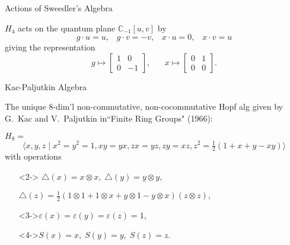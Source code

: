\documentclass{beamer}
\begin{document}
\begin{frame}{Actions of Sweedler's Algebra}

$H_4$ acts on the quantum plane $\mathbb{C}_{-1}[u,v]$ by 
\[
g\cdot u=u, \;\;\; g\cdot v=-v,\;\;\; x\cdot u=0,\;\;\;x\cdot v=u
\]
giving the representation 
\[
g\mapsto \begin{bmatrix} 1 & 0\\ 0&-1\end{bmatrix}, \;\;\;\;\;\; x\mapsto \begin{bmatrix} 0&1\\0&0\end{bmatrix}.
\]

\end{frame}

\begin{frame}{Kac-Paljutkin Algebra}

 The unique $8$-dim'l non-commutative, non-cocommutative Hopf alg given by G.\ Kac and V.\ Paljutkin in``Finite Ring Groups" (1966):\newline

    $H_8=$
    \[\Big\langle x,y,z\;\vert\; x^2=y^2=1,xy=yx,zx=yz,zy=xz,z^2=\tfrac{1}{2}(1+x+y-xy)\Big\rangle\]
    with operations
    \vspace{2ex}
    \begin{itemize}
    \setlength{\itemsep}{2ex}
    \item[]<2->
    $\triangle(x)=x\otimes x,\; \triangle(y)=y\otimes y,\;$ 
    
    \vspace{2ex}
    
    $\triangle(z)=\tfrac{1}{2}(1\otimes 1+1\otimes x+y\otimes 1-y\otimes x)(z\otimes z),\;$
    
    \item[]<3->$
    \varepsilon(x)=\varepsilon(y)=\varepsilon(z)=1,$

    \item[]<4->$ S(x)=x,\;S(y)=y,\;S(z)=z.$ 
    \end{itemize}
\end{frame}
\end{document}
